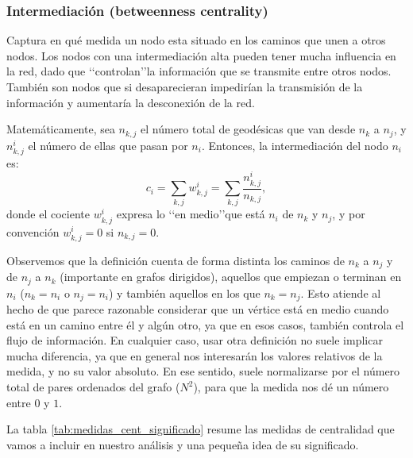 \subsubsection{Intermediación (betweenness centrality)}
Captura en qué medida un nodo esta situado 
en los caminos que unen a otros nodos. Los nodos con una intermediación alta
pueden tener mucha influencia en la red, dado que \lq\lq controlan\rq\rq la información
que se transmite entre otros nodos. También son nodos que si desaparecieran impedirían
la transmisión de la información y aumentaría la desconexión de la red.

Matemáticamente, sea $n_{k,j}$ el número total de geodésicas que van desde $n_k$ a $n_j$,
y $n_{k,j}^{i}$ el número de ellas que pasan por $n_i$. Entonces, la
intermediación del nodo $n_i$ es:
$$c_i = \sum_{k,j} w_{k,j}^{i} = \sum_{k,j} \frac{n_{k,j}^{i}}{n_{k,j}},$$
donde el cociente $w_{k,j}^{i}$ expresa lo \lq\lq en medio\rq\rq que está $n_i$ de
$n_k$ y $n_j$, y por convención $w_{k,j}^{i} = 0$ si $n_{k,j} = 0$. 

Observemos que
la definición cuenta de forma distinta los caminos de $n_k$ a $n_j$ y de $n_j$ a $n_k$ 
(importante en grafos dirigidos), aquellos que empiezan o terminan en $n_i$ ($n_k=n_i$ o $n_j=n_i$) y también aquellos en los que $n_k=n_j$. Esto atiende al hecho de que parece razonable considerar
que un vértice está en medio cuando está en un camino entre él y algún otro, ya que en esos casos, también controla el flujo de información. En cualquier caso, usar otra definición no suele 
implicar mucha diferencia, ya que en general nos interesarán los valores relativos de la medida, y no
su valor absoluto. En ese sentido, suele normalizarse por el número total de pares ordenados
del grafo ($N^2$), para que la medida nos dé un número entre $0$ y $1$.

La tabla \ref{tab:medidas_cent_significado} resume las medidas de centralidad que vamos a incluir en nuestro análisis y una pequeña idea de su significado.

